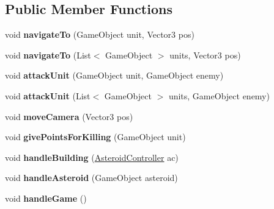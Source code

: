 \subsection*{Public Member Functions}
\begin{DoxyCompactItemize}
\item 
\hypertarget{class_game_controller_a7533fd7506ef2ef51f35050cbf109c20}{}void {\bfseries navigate\+To} (Game\+Object unit, Vector3 pos)\label{class_game_controller_a7533fd7506ef2ef51f35050cbf109c20}

\item 
\hypertarget{class_game_controller_a19eacaf7b7a58d12ef03508959eb44d5}{}void {\bfseries navigate\+To} (List$<$ Game\+Object $>$ units, Vector3 pos)\label{class_game_controller_a19eacaf7b7a58d12ef03508959eb44d5}

\item 
\hypertarget{class_game_controller_a28daa03c0d2d957778106d03c9519ccc}{}void {\bfseries attack\+Unit} (Game\+Object unit, Game\+Object enemy)\label{class_game_controller_a28daa03c0d2d957778106d03c9519ccc}

\item 
\hypertarget{class_game_controller_a30a6c11927455a2680e61439844ea9d6}{}void {\bfseries attack\+Unit} (List$<$ Game\+Object $>$ units, Game\+Object enemy)\label{class_game_controller_a30a6c11927455a2680e61439844ea9d6}

\item 
\hypertarget{class_game_controller_ac24bfe50e36d1f80f2bb713b35950da4}{}void {\bfseries move\+Camera} (Vector3 pos)\label{class_game_controller_ac24bfe50e36d1f80f2bb713b35950da4}

\item 
\hypertarget{class_game_controller_a0a08dc740a2404be333418899e702fb9}{}void {\bfseries give\+Points\+For\+Killing} (Game\+Object unit)\label{class_game_controller_a0a08dc740a2404be333418899e702fb9}

\item 
\hypertarget{class_game_controller_af3c1116017242ec65bb53045f32447f6}{}void {\bfseries handle\+Building} (\hyperlink{class_asteroid_controller}{Asteroid\+Controller} ac)\label{class_game_controller_af3c1116017242ec65bb53045f32447f6}

\item 
\hypertarget{class_game_controller_a81d580922a9967dadf5c777c2a9a004f}{}void {\bfseries handle\+Asteroid} (Game\+Object asteroid)\label{class_game_controller_a81d580922a9967dadf5c777c2a9a004f}

\item 
\hypertarget{class_game_controller_ae1cb09c065288c83179440a8c7132672}{}void {\bfseries handle\+Game} ()\label{class_game_controller_ae1cb09c065288c83179440a8c7132672}


\end{DoxyCompactItemize}
